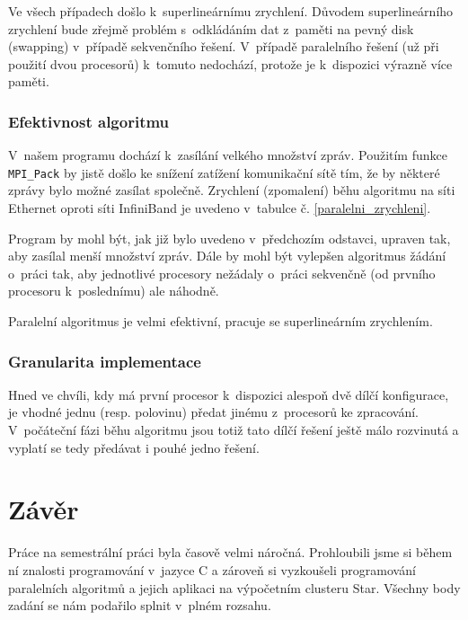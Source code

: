 \documentclass[12pt]{article}
\begin{document}
Ve všech případech došlo k~superlineárnímu zrychlení. Důvodem superlineárního zrychlení bude zřejmě problém s~odkládáním dat z~paměti na pevný disk (swapping) v~případě sekvenčního řešení. V~případě paralelního řešení (už při použití dvou procesorů) k~tomuto nedochází, protože je k~dispozici výrazně více paměti.

\subsubsection{Efektivnost algoritmu}
V~našem programu dochází k~zasílání velkého množství zpráv. Použitím funkce \texttt{MPI\_Pack} by jistě došlo ke snížení zatížení komunikační sítě tím, že by některé zprávy bylo možné zasílat společně. Zrychlení (zpomalení) běhu algoritmu na síti Ethernet oproti síti InfiniBand je uvedeno v~tabulce č. \ref{paralelni_zrychleni}.

Program by mohl být, jak již bylo uvedeno v~předchozím odstavci, upraven tak, aby zasílal menší množství zpráv. Dále by mohl být vylepšen algoritmus žádání o~práci tak, aby jednotlivé procesory nežádaly o~práci sekvenčně (od prvního procesoru k~poslednímu) ale náhodně.

Paralelní algoritmus je velmi efektivní, pracuje se superlineárním zrychlením. 

\subsubsection{Granularita implementace}

Hned ve chvíli, kdy má první procesor k~dispozici alespoň dvě dílčí konfigurace, je vhodné jednu (resp. polovinu) předat jinému z~procesorů ke zpracování. V~počáteční fázi běhu algoritmu jsou totiž tato dílčí řešení ještě málo rozvinutá a vyplatí se tedy předávat i pouhé jedno řešení.

\section{Závěr}

Práce na semestrální práci byla časově velmi náročná. Prohloubili jsme si během ní znalosti programování v~jazyce C a zároveň si vyzkoušeli programování paralelních algoritmů a jejich aplikaci na výpočetním clusteru Star. Všechny body zadání se nám podařilo splnit v~plném rozsahu.
\end{document}
